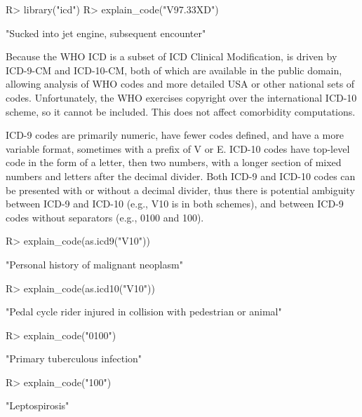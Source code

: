 \documentclass[article]{jss}
\begin{document}
\begin{CodeChunk}

\begin{CodeInput}
R> library("icd")
R> explain_code("V97.33XD")
\end{CodeInput}

\begin{CodeOutput}
[1] "Sucked into jet engine, subsequent encounter"
\end{CodeOutput}
\end{CodeChunk}

Because the WHO ICD is a subset of ICD Clinical Modification, 
is driven by ICD-9-CM and ICD-10-CM, both of which are available in the
public domain, allowing analysis of WHO codes and more detailed USA or
other national sets of codes. Unfortunately, the WHO exercises copyright
over the international ICD-10 scheme, so it cannot be included. This
does not affect comorbidity computations.

ICD-9 codes are primarily numeric, have fewer codes defined, and have a
more variable format, sometimes with a prefix of V or E. ICD-10 codes
have top-level code in the form of a letter, then two numbers, with a
longer section of mixed numbers and letters after the decimal divider.
Both ICD-9 and ICD-10 codes can be presented with or without a decimal
divider, thus there is potential ambiguity between ICD-9 and ICD-10
(e.g., V10 is in both schemes), and between ICD-9 codes without
separators (e.g., 0100 and 100).

\begin{CodeChunk}

\begin{CodeInput}
R> explain_code(as.icd9("V10"))
\end{CodeInput}

\begin{CodeOutput}
[1] "Personal history of malignant neoplasm"
\end{CodeOutput}

\begin{CodeInput}
R> explain_code(as.icd10("V10"))
\end{CodeInput}

\begin{CodeOutput}
[1] "Pedal cycle rider injured in collision with pedestrian or animal"
\end{CodeOutput}

\begin{CodeInput}
R> explain_code("0100")
\end{CodeInput}

\begin{CodeOutput}
[1] "Primary tuberculous infection"
\end{CodeOutput}

\begin{CodeInput}
R> explain_code("100")
\end{CodeInput}

\begin{CodeOutput}
[1] "Leptospirosis"
\end{CodeOutput}
\end{CodeChunk}
\end{document}
